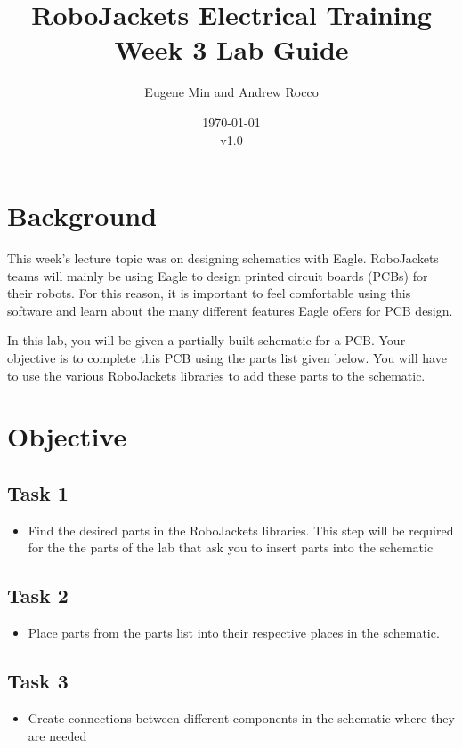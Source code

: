 \documentclass{article}
\title{RoboJackets Electrical Training Week 3 Lab Guide}
\author{Eugene Min and Andrew Rocco}
\date{\today\\v1.0}
\begin{document}
\maketitle{}
\setcounter{tocdepth}{2}
\tableofcontents
\pagebreak


\section{Background}
This week's lecture topic was on designing schematics with Eagle. RoboJackets teams will mainly be using Eagle to design printed circuit boards (PCBs) for their robots. For this reason, it is important to feel comfortable using this software and learn about the many different features Eagle offers for PCB design.

In this lab, you will be given a partially built schematic for a PCB. Your objective is to complete this PCB using the parts list given below. You will have to use the various RoboJackets libraries to add these parts to the schematic. 


\section{Objective}
\subsection{Task 1}
\begin{itemize}
    \item Find the desired parts in the RoboJackets libraries. This step will be required for the the parts of the lab that ask you to insert parts into the schematic
\end{itemize}
\subsection{Task 2}
\begin{itemize}
    \item Place parts from the parts list into their respective places in the schematic.
\end{itemize}
\subsection{Task 3}
\begin{itemize}
    \item Create connections between different components in the schematic where they are needed
\end{itemize}
\end{document}
